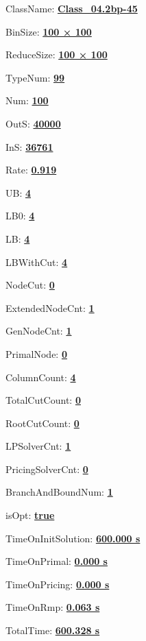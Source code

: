 \documentclass[11pt]{article}
\begin{document}
\pagestyle{empty}


ClassName: \underline{\textbf{Class_04.2bp-45}}
\par
BinSize: \underline{\textbf{100 × 100}}
\par
ReduceSize: \underline{\textbf{100 × 100}}
\par
TypeNum: \underline{\textbf{99}}
\par
Num: \underline{\textbf{100}}
\par
OutS: \underline{\textbf{40000}}
\par
InS: \underline{\textbf{36761}}
\par
Rate: \underline{\textbf{0.919}}
\par
UB: \underline{\textbf{4}}
\par
LB0: \underline{\textbf{4}}
\par
LB: \underline{\textbf{4}}
\par
LBWithCut: \underline{\textbf{4}}
\par
NodeCut: \underline{\textbf{0}}
\par
ExtendedNodeCnt: \underline{\textbf{1}}
\par
GenNodeCnt: \underline{\textbf{1}}
\par
PrimalNode: \underline{\textbf{0}}
\par
ColumnCount: \underline{\textbf{4}}
\par
TotalCutCount: \underline{\textbf{0}}
\par
RootCutCount: \underline{\textbf{0}}
\par
LPSolverCnt: \underline{\textbf{1}}
\par
PricingSolverCnt: \underline{\textbf{0}}
\par
BranchAndBoundNum: \underline{\textbf{1}}
\par
isOpt: \underline{\textbf{true}}
\par
TimeOnInitSolution: \underline{\textbf{600.000 s}}
\par
TimeOnPrimal: \underline{\textbf{0.000 s}}
\par
TimeOnPricing: \underline{\textbf{0.000 s}}
\par
TimeOnRmp: \underline{\textbf{0.063 s}}
\par
TotalTime: \underline{\textbf{600.328 s}}
\par
\newpage
\end{document}
